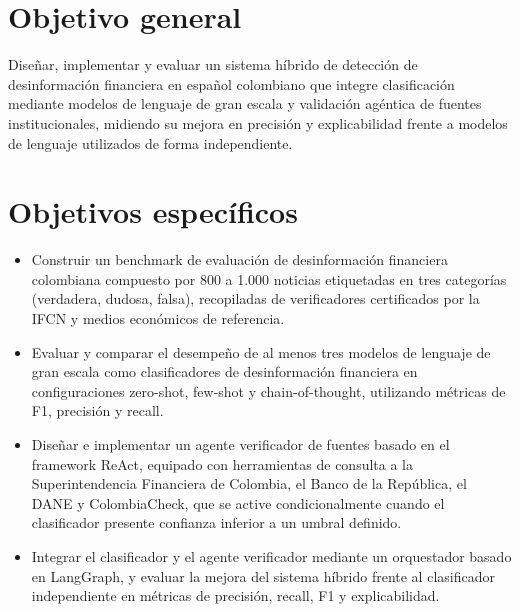 \section{Objetivo general}

Diseñar, implementar y evaluar un sistema híbrido de detección de desinformación financiera en español colombiano que integre clasificación mediante modelos de lenguaje de gran escala y validación agéntica de fuentes institucionales, midiendo su mejora en precisión y explicabilidad frente a modelos de lenguaje utilizados de forma independiente.

\section{Objetivos específicos}
\begin{itemize}
    \item Construir un benchmark de evaluación de desinformación financiera colombiana compuesto por 800 a 1.000 noticias etiquetadas en tres categorías (verdadera, dudosa, falsa), recopiladas de verificadores certificados por la IFCN y medios económicos de referencia.
    \item Evaluar y comparar el desempeño de al menos tres modelos de lenguaje de gran escala como clasificadores de desinformación financiera en configuraciones zero-shot, few-shot y chain-of-thought, utilizando métricas de F1, precisión y recall.
    \item Diseñar e implementar un agente verificador de fuentes basado en el framework ReAct, equipado con herramientas de consulta a la Superintendencia Financiera de Colombia, el Banco de la República, el DANE y ColombiaCheck, que se active condicionalmente cuando el clasificador presente confianza inferior a un umbral definido.
    \item Integrar el clasificador y el agente verificador mediante un orquestador basado en LangGraph, y evaluar la mejora del sistema híbrido frente al clasificador independiente en métricas de precisión, recall, F1 y explicabilidad.
\end{itemize}
